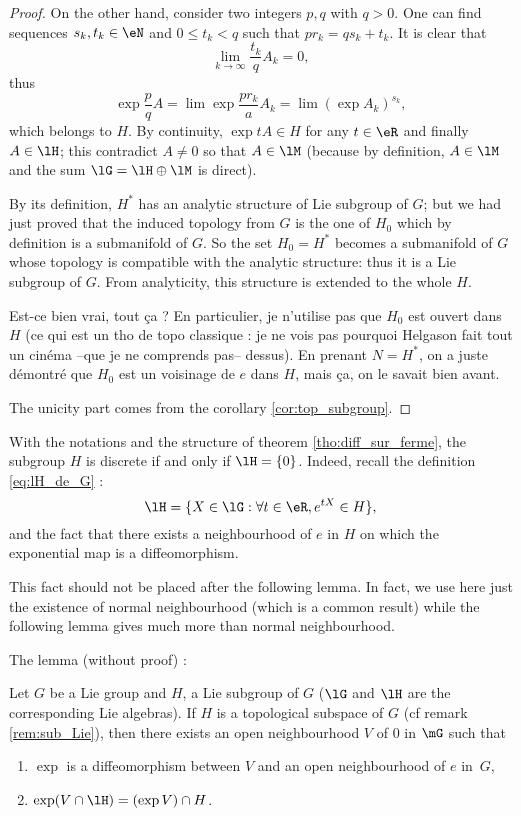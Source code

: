 \begin{proof}
On the other hand, consider two integers $p,q$ with $q>0$. One can find sequences $s_k,t_k\in\eN$ and $0\leq t_k<q$ such that $pr_k=qs_k+t_k$. It is clear that 
\begin{equation}
  \lim_{k\to\infty}\frac{t_k}{q}A_k=0,
\end{equation}
thus
\[
   \exp \frac{p}{q}A=\lim \exp\frac{pr_k}{a}A_k=\lim (\exp A_k)^{s_k},
\]
which belongs to $H$. By continuity, $\exp tA\in H$ for any $t\in\eR$ and finally $A\in\lH$; this contradict $A\neq 0$ so that $A\in\lM$ (because by definition, $A\in\lM$ and the sum $\lG=\lH\oplus\lM$ is direct).

By its definition, $H^*$ has an analytic structure of Lie subgroup of $G$; but we had just proved that the induced topology from $G$ is the one of $H_0$ which by definition is a submanifold of $G$. So the set $H_0=H^*$ becomes a submanifold of $G$ whose topology is compatible with the analytic structure: thus it is a Lie subgroup of $G$. From analyticity, this structure is extended to the whole $H$.

\begin{probleme}
Est-ce bien vrai, tout \c ca ? En particulier, je n'utilise pas que $H_0$ est ouvert dans $H$ (ce qui est un tho de topo classique : je ne vois pas pourquoi Helgason fait tout un cin\'ema --que je ne comprends pas-- dessus). En prenant $N=H^*$, on a juste d\'emontr\'e que $H_0$ est un voisinage de $e$ dans $H$, mais ça, on le savait bien avant.
\end{probleme}

The unicity part comes from the corollary \ref{cor:top_subgroup}.
\end{proof}


With the notations and the structure of theorem \ref{tho:diff_sur_ferme}, the subgroup $H$ is discrete if and only if $\lH=\{0\}$. Indeed, recall the definition \eqref{eq:lH_de_G} :
\[
  \lH=\{X\in\lG: \forall t\in\eR, e^{tX}\in H\},
\]
and the fact that there exists a neighbourhood of $e$ in $H$ on which the exponential map is a diffeomorphism.

\begin{remark}
This fact should not be placed after the following lemma. In fact, we use here just the existence of normal neighbourhood (which is a common result) while the following lemma gives much more than normal neighbourhood.
\end{remark}

The lemma (without proof) :

\begin{lemma} 
 Let $G$ be a Lie group and $H$, a Lie subgroup of $G$ ($\lG$ and $\lH$ are the corresponding Lie algebras). If $H$ is a topological subspace of $G$ (cf remark \ref{rem:sub_Lie}), then there exists an open neighbourhood $V$ of $0$ in $\mG$ such that
 \begin{enumerate}
 \item $\exp$ is a diffeomorphism between $V$ and an open neighbourhood of $e$ in~$G$,
 \item $\exp(V\cap\lH)=(\exp V)\cap H$.
 \end{enumerate}
\label{lem:sugroup_normal}
\end{lemma}

